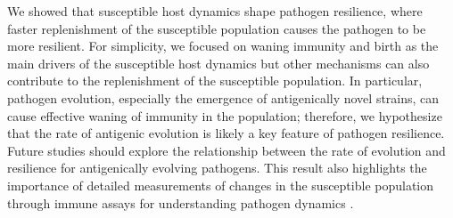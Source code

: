 \documentclass[12pt]{article}
\begin{document}
We showed that susceptible host dynamics shape pathogen resilience, where faster replenishment of the susceptible population causes the pathogen to be more resilient.
For simplicity, we focused on waning immunity and birth as the main drivers of the susceptible host dynamics but other mechanisms can also contribute to the replenishment of the susceptible population.
In particular, pathogen evolution, especially the emergence of antigenically novel strains, can cause effective waning of immunity in the population;
therefore, we hypothesize that the rate of antigenic evolution is likely a key feature of pathogen resilience.
Future studies should explore the relationship between the rate of evolution and resilience for antigenically evolving pathogens.
This result also highlights the importance of detailed measurements of changes in the susceptible population through immune assays for understanding pathogen dynamics \citep{nguyen2022enterovirus}.
\end{document}
